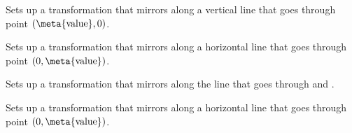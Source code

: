 \begin{paracol}{2}
\begin{command}{\pgfexttransformxMirror{}}\cmdcompat\pgftransformxMirror
  Sets up a transformation that mirrors along a vertical line that goes through point $(\text{\meta{value}}, 0)$.

\begin{codeexample}[preamble=\usepgflibrary{ext.transformations.mirror}]
\end{codeexample}
\end{command}

\switchcolumn*%

\begin{command}{\pgfexttransformymirror{}}\cmdcompat\pgftransformymirror
  Sets up a transformation that mirrors along a horizontal line that goes through point $(0, \text{\meta{value})}$.
\end{command}

\begin{command}{\pgfexttransformmirror{}}\cmdcompat\pgftransformmirror
  Sets up a transformation that mirrors along the line that goes through  and .
 
\begin{codeexample}[preamble=\usepgflibrary{ext.transformations.mirror}]
\end{codeexample}
\end{command}

\switchcolumn%

\begin{command}{\pgfexttransformyMirror{}}\cmdcompat\pgftransformyMirror
  Sets up a transformation that mirrors along a horizontal line that goes through point $(0, \text{\meta{value})}$.
\end{command}


\end{paracol}
